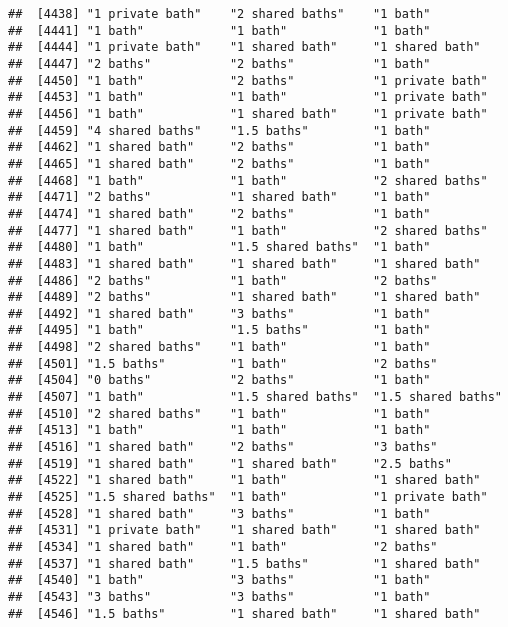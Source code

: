 \documentclass[
]{article}
\begin{document}
\begin{verbatim}
##  [4438] "1 private bath"    "2 shared baths"    "1 bath"           
##  [4441] "1 bath"            "1 bath"            "1 bath"           
##  [4444] "1 private bath"    "1 shared bath"     "1 shared bath"    
##  [4447] "2 baths"           "2 baths"           "1 bath"           
##  [4450] "1 bath"            "2 baths"           "1 private bath"   
##  [4453] "1 bath"            "1 bath"            "1 private bath"   
##  [4456] "1 bath"            "1 shared bath"     "1 private bath"   
##  [4459] "4 shared baths"    "1.5 baths"         "1 bath"           
##  [4462] "1 shared bath"     "2 baths"           "1 bath"           
##  [4465] "1 shared bath"     "2 baths"           "1 bath"           
##  [4468] "1 bath"            "1 bath"            "2 shared baths"   
##  [4471] "2 baths"           "1 shared bath"     "1 bath"           
##  [4474] "1 shared bath"     "2 baths"           "1 bath"           
##  [4477] "1 shared bath"     "1 bath"            "2 shared baths"   
##  [4480] "1 bath"            "1.5 shared baths"  "1 bath"           
##  [4483] "1 shared bath"     "1 shared bath"     "1 shared bath"    
##  [4486] "2 baths"           "1 bath"            "2 baths"          
##  [4489] "2 baths"           "1 shared bath"     "1 shared bath"    
##  [4492] "1 shared bath"     "3 baths"           "1 bath"           
##  [4495] "1 bath"            "1.5 baths"         "1 bath"           
##  [4498] "2 shared baths"    "1 bath"            "1 bath"           
##  [4501] "1.5 baths"         "1 bath"            "2 baths"          
##  [4504] "0 baths"           "2 baths"           "1 bath"           
##  [4507] "1 bath"            "1.5 shared baths"  "1.5 shared baths" 
##  [4510] "2 shared baths"    "1 bath"            "1 bath"           
##  [4513] "1 bath"            "1 bath"            "1 bath"           
##  [4516] "1 shared bath"     "2 baths"           "3 baths"          
##  [4519] "1 shared bath"     "1 shared bath"     "2.5 baths"        
##  [4522] "1 shared bath"     "1 bath"            "1 shared bath"    
##  [4525] "1.5 shared baths"  "1 bath"            "1 private bath"   
##  [4528] "1 shared bath"     "3 baths"           "1 bath"           
##  [4531] "1 private bath"    "1 shared bath"     "1 shared bath"    
##  [4534] "1 shared bath"     "1 bath"            "2 baths"          
##  [4537] "1 shared bath"     "1.5 baths"         "1 shared bath"    
##  [4540] "1 bath"            "3 baths"           "1 bath"           
##  [4543] "3 baths"           "3 baths"           "1 bath"           
##  [4546] "1.5 baths"         "1 shared bath"     "1 shared bath"    

\end{verbatim}
\end{document}

